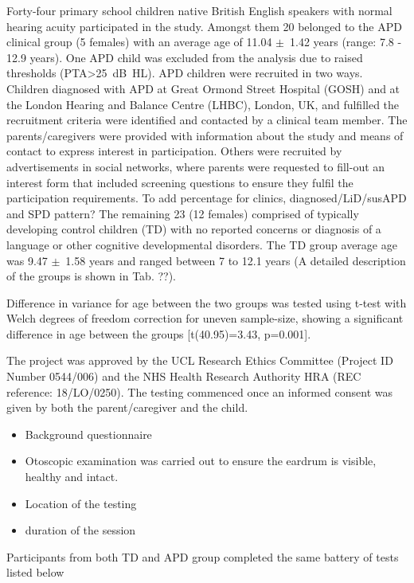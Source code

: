 \documentclass[a4paper, twoside]{templates/ociamthesis}
\providecommand{\tightlist}{%
  \setlength{\itemsep}{0pt}\setlength{\parskip}{0pt}}
\begin{document}
Forty-four primary school children native British English speakers with normal hearing acuity participated in the study. Amongst them 20 belonged to the APD clinical group (5 females) with an average age of 11.04 \(\pm\)~1.42 years (range: 7.8 - 12.9 years). One APD child was excluded from the analysis due to raised thresholds (PTA\textgreater25~dB~HL). APD children were recruited in two ways. Children diagnosed with APD at Great Ormond Street Hospital (GOSH) and at the London Hearing and Balance Centre (LHBC), London, UK, and fulfilled the recruitment criteria were identified and contacted by a clinical team member. The parents/caregivers were provided with information about the study and means of contact to express interest in participation. Others were recruited by advertisements in social networks, where parents were requested to fill-out an interest form that included screening questions to ensure they fulfil the participation requirements. \colorbox[HTML]{CCCCFF}{To add percentage for clinics, diagnosed/LiD/susAPD and SPD pattern?} The remaining 23 (12 females) comprised of typically developing control children (TD) with no reported concerns or diagnosis of a language or other cognitive developmental disorders. The TD group average age was 9.47 \(\pm\)~1.58 years and ranged between 7 to 12.1 years (A detailed description of the groups is shown in Tab. ??).

Difference in variance for age between the two groups was tested using t-test with Welch degrees of freedom correction for uneven sample-size, showing a significant difference in age between the groups {[}t(40.95)=3.43, p=0.001{]}.

The project was approved by the UCL Research Ethics Committee (Project ID Number 0544/006) and the NHS Health Research Authority HRA (REC reference: 18/LO/0250). The testing commenced once an informed consent was given by both the parent/caregiver and the child.

\begin{itemize}
\tightlist
\item
  Background questionnaire
\item
  Otoscopic examination was carried out to ensure the eardrum is visible, healthy and intact.
\item
  Location of the testing
\item
  duration of the session
\end{itemize}

Participants from both TD and APD group completed the same battery of tests listed below
\end{document}
